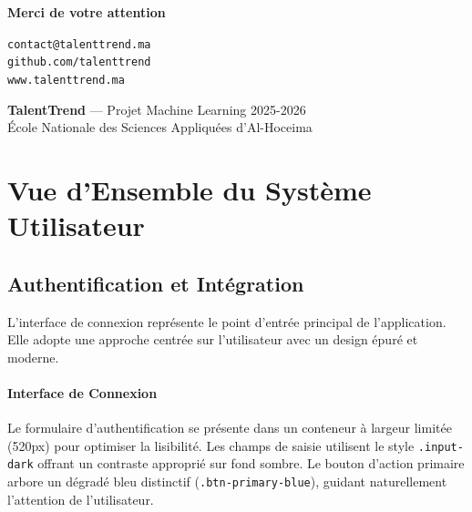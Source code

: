 \documentclass[12pt, a4paper]{report}
\begin{document}
\begin{center}
    \vspace*{5cm}
    
    {\fontsize{36}{44}\selectfont\bfseries\color{white}Merci de votre attention}
    
    \vspace{2cm}
    
    
    \vspace{2cm}
    
    {\Large\color{lightblue}
     \texttt{contact@talenttrend.ma}\\[0.5cm]
     \texttt{github.com/talenttrend}\\[0.5cm]
     \texttt{www.talenttrend.ma}
    }
    
    \vspace{3cm}
    
    {\color{codegray}\small
    \textbf{TalentTrend} --- Projet Machine Learning 2025-2026\\
    École Nationale des Sciences Appliquées d'Al-Hoceima
    }
\end{center}

\section{Vue d'Ensemble du Système Utilisateur}

\subsection{Authentification et Intégration}

L'interface de connexion représente le point d'entrée principal de l'application. Elle adopte une approche centrée sur l'utilisateur avec un design épuré et moderne.

\paragraph{Interface de Connexion}
Le formulaire d'authentification se présente dans un conteneur à largeur limitée (520px) pour optimiser la lisibilité. Les champs de saisie utilisent le style \texttt{.input-dark} offrant un contraste approprié sur fond sombre. Le bouton d'action primaire arbore un dégradé bleu distinctif (\texttt{.btn-primary-blue}), guidant naturellement l'attention de l'utilisateur.
\end{document}
